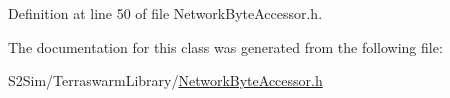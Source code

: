 Definition at line 50 of file Network\-Byte\-Accessor.\-h.



The documentation for this class was generated from the following file\-:\begin{DoxyCompactItemize}
\item 
S2\-Sim/\-Terraswarm\-Library/\hyperlink{_network_byte_accessor_8h}{Network\-Byte\-Accessor.\-h}\end{DoxyCompactItemize}
